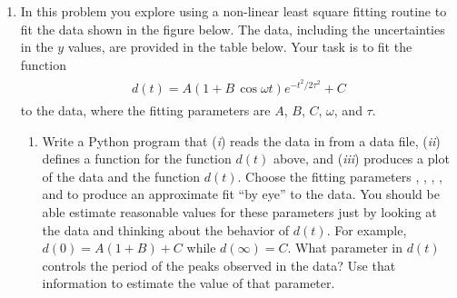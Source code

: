 \documentclass[letterpaper,10pt,english]{sphinxmanual}
\begin{document}
\begin{enumerate}
\begin{enumerate}
\end{enumerate}

\item {} 
In this problem you explore using a non-linear least square fitting routine to fit the data shown in the figure below.   The data, including the uncertainties in the $y$ values, are provided in the table below.  Your task is to fit the function
\label{chap8/chap8_fitting:equation-eq:OscDecay}\begin{gather}
\begin{split}d(t) = A (1+B\,\cos\omega t) e^{-t^2/2\tau^2} + C\end{split}\label{chap8/chap8_fitting-eq:OscDecay}
\end{gather}
to the data, where the fitting parameters are $A$, $B$, $C$, $\omega$, and $\tau$.
\begin{figure}[htbp]
\centering

\label{chap8/chap8_fitting:fig-oscdata}\end{figure}
\begin{enumerate}
\item {} 
Write a Python program that (\emph{i}) reads the data in from a data file, (\emph{ii}) defines a function  for the function $d(t)$ above, and (\emph{iii}) produces a plot of the data and the function $d(t)$.  Choose the fitting parameters  , , , , and  to produce an approximate fit ``by eye'' to the data.  You should be able estimate reasonable values for these parameters just by looking at the data and thinking about the behavior of $d(t)$.  For example, $d(0)=A(1+B)+C$ while $d(\infty)=C$.  What parameter in $d(t)$ controls the period of the peaks observed in the data?  Use that information to estimate the value of that parameter.


\end{enumerate}
\end{enumerate}
\end{document}
